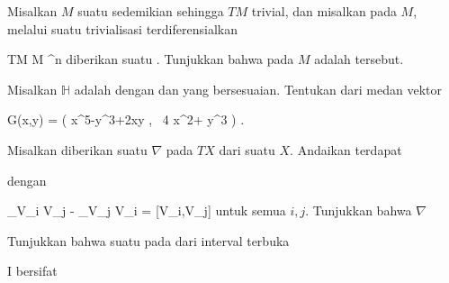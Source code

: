 {}
{

Misalkan $M$ suatu
sedemikian sehingga
$TM$ trivial, dan misalkan pada $M$, melalui suatu trivialisasi terdiferensialkan

\mavergleichskette
{\vergleichskette
{ TM
}
{ \cong }{ M \times \R^n
}
{  }{
}
{    }{
}
{   }{
}
}
{}{}{}
 {} {}
diberikan suatu
 {} {.}
Tunjukkan bahwa
pada $M$ adalah
tersebut.

}
{} {}

{}
{

Misalkan ${\mathbb H}$ adalah
dengan
dan
yang bersesuaian. Tentukan
 dari medan vektor

\mavergleichskettedisp
{\vergleichskette
{ G(x,y)
}
{ =} { \left(  x^5-y^3+2xy  , \,   4 x^2+ y^3                   \right)
}
{ } {
}
{ } {
}
{ } {
}
}
{}{}{.}

}
{} {}

{}
{

Misalkan diberikan suatu
$\nabla$ pada
$TX$ dari suatu
$X$. Andaikan terdapat

 dengan

\mavergleichskettedisp
{\vergleichskette
{ \nabla_{V_i } V_j -  \nabla_{V_j } V_i
}
{ =} { [V_i,V_j]
}
{ } {
}
{ } {
}
{ } {
}
}
{}{}{}
untuk semua $i,j$. Tunjukkan bahwa $\nabla$

}
{} {}

{}
{

Tunjukkan bahwa suatu
pada
dari interval terbuka

\mavergleichskette
{\vergleichskette
{ I
}
{ \subseteq }{ \R
}
{  }{
}
{    }{
}
{   }{
}
}
{}{}{}
bersifat

}
{} {}

